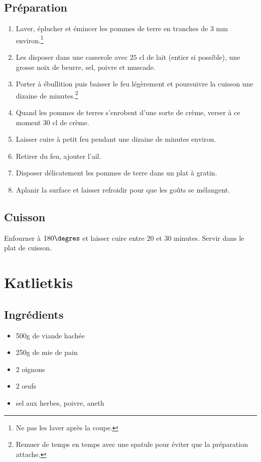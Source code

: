 \subsection*{Préparation}
\begin{enumerate}
\item Laver, éplucher et émincer les pommes de terre en tranches de $3$ mm environ.\footnote{Ne pas les laver après la coupe.}
\item Les disposer dans une casserole avec $25$ cl de lait (entier si possible), une grosse noix de beurre, sel, poivre et muscade.
\item Porter à ébullition puis baisser le feu légèrement et poursuivre la cuisson une dizaine de minutes.\footnote{Remuer de temps en temps avec une spatule pour éviter que la préparation attache.}
\item Quand les pommes de terres s'enrobent d'une sorte de crème, verser à ce moment $30$ cl de crème.
\item Laisser cuire à petit feu pendant une dizaine de minutes environ.
\item Retirer du feu, ajouter l'ail.
\item Disposer délicatement les pommes de terre dans un plat à gratin.
\item Aplanir la surface et laisser refroidir pour que les goûts se mélangent.
\end{enumerate}

\subsection*{Cuisson}
Enfourner à $180\degres$ et laisser cuire entre $20$ et $30$ minutes. Servir dans le plat de cuisson.


\newpage
\section{Katlietkis}
\subsection*{Ingrédients}
\begin{itemize}
\item 500g de viande hachée
\item 250g de mie de pain
\item 2 oignons
\item 2 œufs
\item sel aux herbes, poivre, aneth
\end{itemize}

